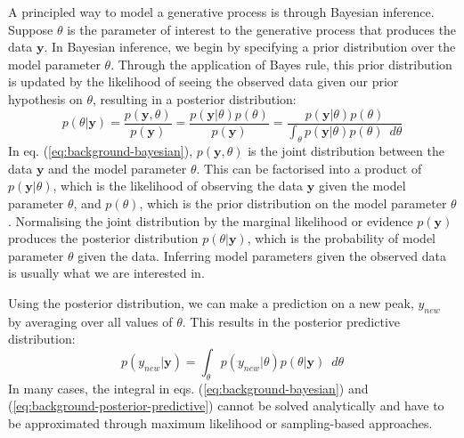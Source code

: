 A principled way to model a generative process is through Bayesian inference. Suppose $\theta$ is the parameter of interest to the generative process that produces the data $\mathbf{y}$. In Bayesian inference, we begin by specifying a prior distribution over the model parameter $\theta$. Through the application of Bayes rule, this prior distribution is updated by the likelihood of seeing the observed data given our prior hypothesis on $\theta$, resulting in a posterior distribution:
\begin{equation}
p(\theta \vert \mathbf{y})=\frac{p(\mathbf{y},\theta)}{p(\mathbf{y})}=\frac{p(\mathbf{y} \vert \theta)p(\theta)}{p(\mathbf{y})}=\frac{p(\mathbf{y} \vert \theta)p(\theta)}{\int_{\theta} p(\mathbf{y} \vert \theta)p(\theta) \enspace d\theta}
\label{eq:background-bayesian}
\end{equation}
In eq. (\ref{eq:background-bayesian}), $p(\mathbf{y},\theta)$ is the joint distribution between the data $\mathbf{y}$ and the model parameter $\theta$. This can be factorised into a product of $p(\mathbf{y} \vert \theta)$, which is the likelihood of observing the data $\mathbf{y}$ given the model parameter $\theta$, and $p(\theta)$, which is the prior distribution on the model parameter $\theta$. Normalising the joint distribution by the marginal likelihood or evidence $p(\mathbf{y})$ produces the posterior distribution $p(\theta \vert \mathbf{y})$, which is the probability of model parameter $\theta$ given the data. Inferring model parameters given the observed data is usually what we are interested in.

Using the posterior distribution, we can make a prediction on a new peak, $y_{new}$ by averaging over all values of $\theta$. This results in the posterior predictive distribution:
\begin{equation}
p(y_{new} \vert \mathbf{y})=\int_{\theta} p(y_{new} \vert \theta) p(\theta \vert \mathbf{y}) \enspace d\theta
\label{eq:background-posterior-predictive}
\end{equation}
In many cases, the integral in eqs. (\ref{eq:background-bayesian}) and (\ref{eq:background-posterior-predictive}) cannot be solved analytically and have to be approximated through maximum likelihood or sampling-based approaches.

